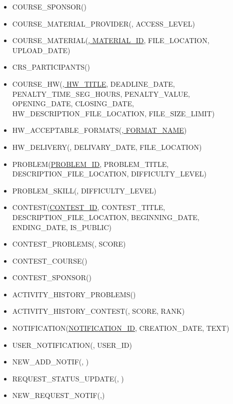\documentclass{article}
\begin{document}
\begin{flushleft}
\begin{latin}
\begin{itemize}
            \item COURSE\_SPONSOR(\underline{})
            \item COURSE\_MATERIAL\_PROVIDER(\underline{}, ACCESS\_LEVEL)
            \item COURSE\_MATERIAL(\underline{, MATERIAL\_ID}, FILE\_LOCATION, UPLOAD\_DATE)
            \item CRS\_PARTICIPANTS(\underline{})
            \item COURSE\_HW(\underline{, HW\_TITLE}, DEADLINE\_DATE, PENALTY\_TIME\_SEG\_HOURS, PENALTY\_VALUE, OPENING\_DATE, CLOSING\_DATE, HW\_DESCRIPTION\_FILE\_LOCATION, FILE\_SIZE\_LIMIT)
            \item HW\_ACCEPTABLE\_FORMATS(\underline{, FORMAT\_NAME})
            \item HW\_DELIVERY(\underline{}, DELIVARY\_DATE, FILE\_LOCATION)
            \item PROBLEM(\underline{PROBLEM\_ID}, PROBLEM\_TITLE, DESCRIPTION\_FILE\_LOCATION, DIFFICULTY\_LEVEL)
            \item PROBLEM\_SKILL(\underline{}, DIFFICULTY\_LEVEL)
            \item CONTEST(\underline{CONTEST\_ID}, CONTEST\_TITLE, DESCRIPTION\_FILE\_LOCATION, BEGINNING\_DATE, ENDING\_DATE, IS\_PUBLIC)
            \item CONTEST\_PROBLEMS(\underline{}, SCORE)
            \item CONTEST\_COURSE(\underline{})
            \item CONTEST\_SPONSOR(\underline{})
            \item ACTIVITY\_HISTORY\_PROBLEMS(\underline{})
            \item ACTIVITY\_HISTORY\_CONTEST(\underline{}, SCORE, RANK)
            \item NOTIFICATION(\underline{NOTIFICATION\_ID}, CREATION\_DATE, TEXT)
            \item USER\_NOTIFICATION(\underline{}, USER\_ID)
            \item NEW\_ADD\_NOTIF(\underline{}, )
            \item REQUEST\_STATUS\_UPDATE(\underline{}, )
            \item NEW\_REQUEST\_NOTIF(\underline{},)
        \end{itemize}
    \end{latin}
\end{flushleft}
\end{document}
